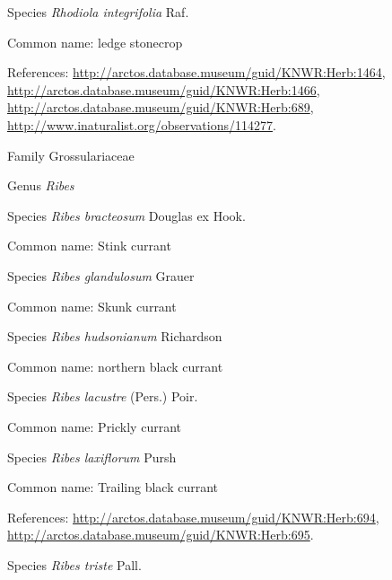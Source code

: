 \documentclass[9pt, article]{memoir}
\begin{document}
\begin{multicols}{2}
\vspace{6pt}\noindent\hspace{36pt}Species \textit{Rhodiola integrifolia} Raf.


Common name: ledge stonecrop

References: 
\url{http://arctos.database.museum/guid/KNWR:Herb:1464}, 
\url{http://arctos.database.museum/guid/KNWR:Herb:1466}, 
\url{http://arctos.database.museum/guid/KNWR:Herb:689}, 
\url{http://www.inaturalist.org/observations/114277}.

\vspace{6pt}\noindent\hspace{24pt}Family Grossulariaceae


\vspace{6pt}\noindent\hspace{30pt}Genus \textit{Ribes}


\vspace{6pt}\noindent\hspace{36pt}Species \textit{Ribes bracteosum} Douglas ex Hook.


Common name: Stink currant

\vspace{6pt}\noindent\hspace{36pt}Species \textit{Ribes glandulosum} Grauer


Common name: Skunk currant

\vspace{6pt}\noindent\hspace{36pt}Species \textit{Ribes hudsonianum} Richardson


Common name: northern black currant

\vspace{6pt}\noindent\hspace{36pt}Species \textit{Ribes lacustre} (Pers.) Poir.


Common name: Prickly currant

\vspace{6pt}\noindent\hspace{36pt}Species \textit{Ribes laxiflorum} Pursh


Common name: Trailing black currant

References: 
\url{http://arctos.database.museum/guid/KNWR:Herb:694}, 
\url{http://arctos.database.museum/guid/KNWR:Herb:695}.

\vspace{6pt}\noindent\hspace{36pt}Species \textit{Ribes triste} Pall.



\end{multicols}
\end{document}

